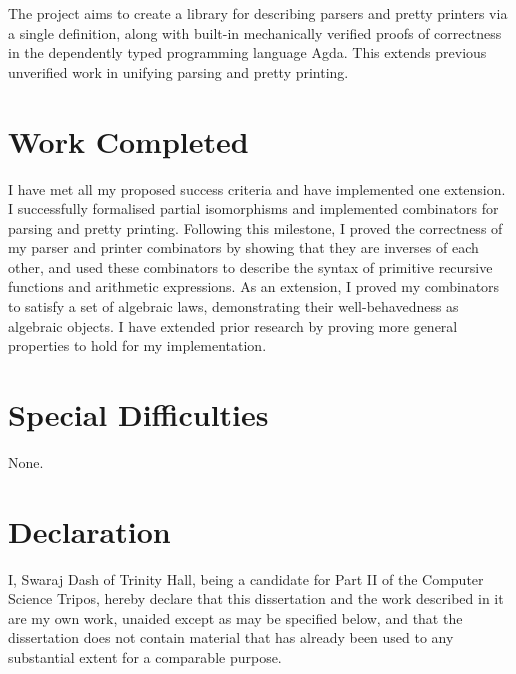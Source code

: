\documentclass[12pt,a4paper,twoside,openright]{report}
\begin{document}
 The project aims to create a library for describing parsers and pretty printers via a single definition, along with built-in mechanically verified proofs of correctness in the dependently typed programming language Agda. This extends previous unverified work in unifying parsing and pretty printing.
 
 \section*{Work Completed}
 
 I have met all my proposed success criteria and have implemented one extension. I successfully formalised partial isomorphisms and implemented combinators for parsing and pretty printing. Following this milestone, I proved the correctness of my parser and printer combinators by showing that they are inverses of each other, and used these combinators to describe the syntax of primitive recursive functions and arithmetic expressions. As an extension, I proved my combinators to satisfy a set of algebraic laws, demonstrating their well-behavedness as algebraic objects. I have extended prior research by proving more general properties to hold for my implementation.
 
 \section*{Special Difficulties}
 
 None.
  
 \newpage
 \section*{Declaration}
 
 I, Swaraj Dash of Trinity Hall, being a candidate for Part II of the Computer
 Science Tripos, hereby declare
 that this dissertation and the work described in it are my own work,
 unaided except as may be specified below, and that the dissertation
 does not contain material that has already been used to any substantial
 extent for a comparable purpose.
 
\bigskip
{}

\

 
 \tableofcontents
 
 \listoffigures
 
 \listoftables
 
 \newpage
\end{document}
